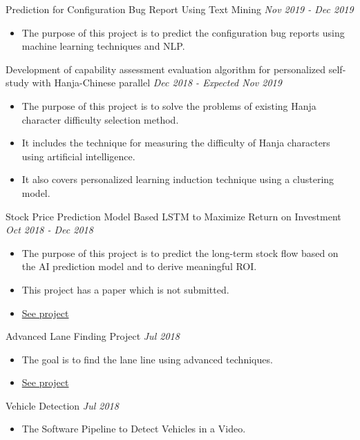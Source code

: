 \documentclass[10pt]{article}
\newenvironment{changemargin}[2]{
  \begin{list}{}{
    \setlength{\topsep}{0pt}
    \setlength{\leftmargin}{#1}
    \setlength{\rightmargin}{#2}
    \setlength{\listparindent}{\parindent}
    \setlength{\itemindent}{\parindent}
    \setlength{\parsep}{\parskip}
  }
  \item[]}{\end{list}
}
\newcommand{\project}[2]{
	{#1} \hfill \emph{#2}\\ \medskip
}
\newenvironment{body} {
	\vspace*{-16pt}
	\begin{changemargin}{-0.25in}{-0.5in}
  }
	{\end{changemargin}
}
\begin{document}
\begin{body}
	\vspace{14pt}
\project{Prediction for Configuration Bug Report Using Text Mining}{Nov 2019 - Dec 2019}
\begin{itemize} \itemsep -0pt  %
      \item  The purpose of this project is to predict the configuration bug reports using machine learning techniques and NLP.
  	\end{itemize}
\project{Development of capability assessment evaluation algorithm for personalized self-study with Hanja-Chinese parallel}{Dec 2018 - Expected Nov 2019}
\begin{itemize} \itemsep -0pt  %
      \item  The purpose of this project is to solve the problems of existing Hanja character difficulty selection method.
      \item It includes the technique for measuring the difficulty of Hanja characters using artificial intelligence.
      \item It also covers personalized learning induction technique using a clustering model.
  	\end{itemize}
\project{Stock Price Prediction Model Based LSTM to Maximize Return on Investment}{Oct 2018 - Dec 2018}
\begin{itemize} \itemsep -0pt  %
      \item  The purpose of this project is to predict the long-term stock flow based on the AI prediction model and to derive meaningful ROI.
      \item This project has a paper which is not submitted.
      \item \href{https://drive.google.com/file/d/1Fp3WmoBpHpYU13fNWS1vbQSzmBCR3MIu/view}{See project}
  	\end{itemize}
\project{Advanced Lane Finding Project}{Jul 2018}
\begin{itemize} \itemsep -0pt  %
      \item  The goal is to find the lane line using advanced techniques.
      \item \href{https://github.com/jeongwhanchoi/CarND-Advanced-Lane-Lines}{See project}
  	\end{itemize}
\project{Vehicle Detection}{Jul 2018}
\begin{itemize} \itemsep -0pt  %
      \item  The Software Pipeline to Detect Vehicles in a Video.

\end{itemize}
\end{body}
\end{document}
